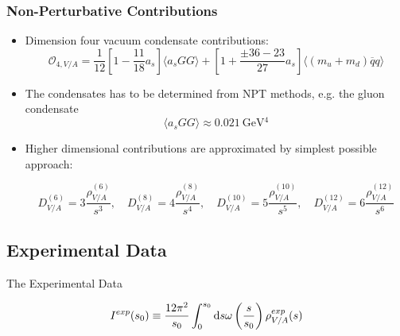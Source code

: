 \documentclass{beamer}
\begin{document}
\begin{frame}
  \frametitle{Non-Perturbative Contributions}
  \begin{itemize}
  \item Dimension four vacuum condensate contributions: 
    \begin{equation}
      \mathcal{O}_{4,V/A} = \frac{1}{12}\left[ 1 - \frac{11}{18}a_s \right] \langle  a_s GG \rangle
      + \left[ 1 + \frac{\pm 36 - 23}{27} a_s \right] \langle (m_u + m_d) \overline{q}q \rangle
    \end{equation}
  \item The condensates has to be determined from NPT methods, e.g. the gluon condensate
    \begin{equation}
      \langle a_s GG \rangle \approx \SI{0.021}{\giga\eV^4}
    \end{equation}
  \item Higher dimensional contributions are approximated by simplest possible approach:
    \begin{small}
      \begin{equation}
        D_{V/A}^{(6)} = 3 \frac{\rho_{V/A}^{(6)}}{s^3}, \quad
        D_{V/A}^{(8)} = 4 \frac{\rho_{V/A}^{(8)}}{s^4}, \quad
        D_{V/A}^{(10)} = 5 \frac{\rho_{V/A}^{(10)}}{s^5}, \quad
        D_{V/A}^{(12)} = 6 \frac{\rho_{V/A}^{(12)}}{s^6}
      \end{equation}
    \end{small}
  \end{itemize} 
\end{frame}


\subsection{Experimental Data}
\begin{frame}
  \centering
  \vspace{0.5cm}
  \begin{LARGE}
    The Experimental Data
  \end{LARGE}
  \begin{equation}
    I^{exp}(s_0) \equiv \frac{12 \pi^2}{s_0} \int_0^{s_0} \dif s \omega\left(\frac{s}{s_0}\right) \rho^{exp}_{V/A}(s)
  \end{equation}
\end{frame}
\end{document}
